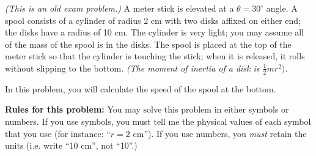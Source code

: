 \documentclass[12pt]{article}
\begin{document}
%
%
%
%	
%		
%	
%	
%	
%	
	
	\newpage
	
	
	\textit{(This is an old exam problem.)} A meter stick is elevated at a $\theta=30^\circ$ angle. A spool consists of a cylinder of radius 2 cm with two disks affixed on either end; the disks have a 
	radius of 10 cm. The cylinder is very light; you may assume all of the mass of the spool is in the disks. The spool is placed at the top of the meter stick
	so that the cylinder is touching the stick; when it is released, it rolls without slipping to the bottom. \it (The moment of inertia of a disk is $\frac{1}{2}mr^2)$. \rm
	
	In this problem, you will calculate the speed of the spool at the bottom. 
	
	\small
	
	{\bf Rules for this problem:} You may solve this problem in either symbols or numbers. 
	If you use symbols, you must tell me the physical values of each symbol that you use (for instance: ``$r=2$ cm''). If you use numbers, you {\it must} retain the
	units (i.e. write ``10 cm'', not ``10''.)
	
	\normalsize
	
\end{document}
